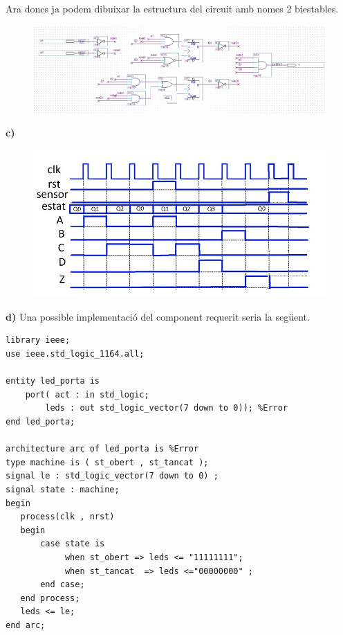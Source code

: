 \documentclass[12pt, a4papre]{article}
\begin{document}
	Ara doncs ja podem dibuixar la estructura del circuit amb nomes 2 biestables.
	
	\begin{figure}[H]
		\begin{center}
		\includegraphics[width=140mm]{DisenyB.jpeg}
		\end{center}
	\end{figure}
	
	\textbf{c)}
	
	\begin{figure}[H]
		\begin{center}
		\includegraphics[width=130mm]{cronogramaBo.jpeg}
		\end{center}
	\end{figure}
	
	\textbf{d)} Una possible implementació del component requerit seria la següent.
	
	\begin{lstlisting}[style=vhdl, frame=single, basicstyle=\small]
library ieee;
use ieee.std_logic_1164.all;

entity led_porta is
    port( act : in std_logic;  
        leds : out std_logic_vector(7 down to 0)); %Error
end led_porta;

architecture arc of led_porta is %Error
type machine is ( st_obert , st_tancat );
signal le : std_logic_vector(7 down to 0) ;  
signal state : machine;
begin
   process(clk , nrst)
   begin
       case state is
            when st_obert => leds <= "11111111";
            when st_tancat  => leds <="00000000" ;
       end case;
   end process;
   leds <= le;
end arc;
	\end{lstlisting}
\end{document}
